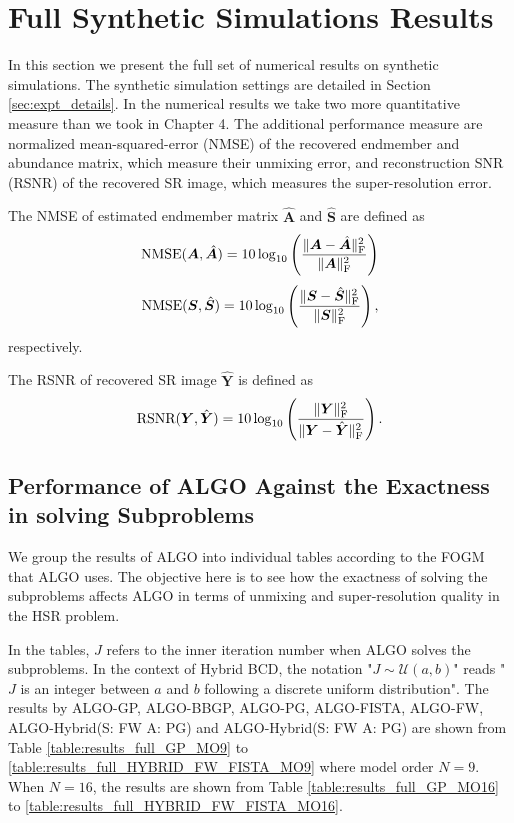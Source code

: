 \chapter{Full Synthetic Simulations Results}
In this section we present the full set of numerical results on synthetic
simulations.
The synthetic simulation settings are detailed in Section \ref{sec:expt_details}.
In the numerical results we take two more quantitative measure than we took in
Chapter 4.
The additional performance measure are normalized mean-squared-error (NMSE) of
the recovered endmember and abundance matrix, which measure their unmixing
error, and reconstruction SNR (RSNR) of the recovered SR image, which measures
the super-resolution error.

The NMSE of estimated endmember matrix $\hat{\bm A}$ and $\hat{\bm S}$ are
defined as
\begin{equation}
    \text{NMSE}(\bm A,\hat{\bm A})
    =
    10 \log_{10} \left(
    \frac{ \Vert \bm A - \hat{\bm A} \Vert_\text F^2 } {\Vert \bm A \Vert_\text F^2}
    \right)
\end{equation}
\begin{equation}
    \text{NMSE}(\bm S,\hat{\bm S})
    =
    10 \log_{10} \left(
    \frac{ \Vert \bm S - \hat{\bm S} \Vert_\text F^2 } {\Vert \bm S \Vert_\text F^2}
    \right),
\end{equation}
respectively.

The RSNR of recovered SR image $\hat{\bm Y}$ is defined as
\begin{equation}
    \text{RSNR}(\bm Y,\hat{\bm Y}) = 10 \log_{10}
    \left( \frac{\Vert\bm Y\Vert_\text F^2} {\Vert\bm Y-\hat{\bm Y}\Vert_\text F^2} \right).
\end{equation}

\section{Performance of ALGO Against the Exactness in solving Subproblems}
We group the results of ALGO into individual tables according to the FOGM that
ALGO uses.
The objective here is to see how the exactness of solving the subproblems
affects ALGO in terms of unmixing and super-resolution quality in the HSR
problem.

In the tables, $J$ refers to the inner iteration number when ALGO solves the
subproblems.
In the context of Hybrid BCD, the notation "$J\sim\mathcal U(a,b)$" reads "$J$
is an integer between $a$ and $b$ following a discrete uniform distribution".
The results by ALGO-GP, ALGO-BBGP, ALGO-PG, ALGO-FISTA, ALGO-FW,
ALGO-Hybrid(S: FW A: PG) and ALGO-Hybrid(S: FW A: PG) are shown from Table
\ref{table:results_full_GP_MO9} to \ref{table:results_full_HYBRID_FW_FISTA_MO9}
where model order $N = 9$.
When $N = 16$, the results are shown from Table \ref{table:results_full_GP_MO16}
to \ref{table:results_full_HYBRID_FW_FISTA_MO16}.

